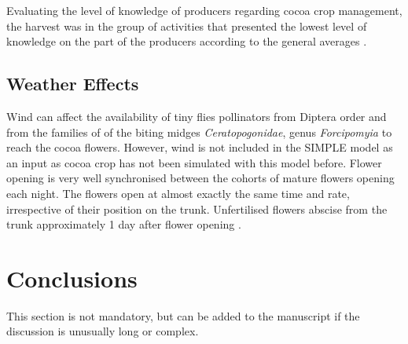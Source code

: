 \documentclass[gene,journal,article,submit,moreauthors,pdftex]{Definitions/mdpi}
\begin{document}
Evaluating the level of knowledge of producers regarding cocoa crop management, the harvest was in the group of activities that presented the lowest level of knowledge on the part of the producers according to the general averages \citep{Gutierrez2020}. 

\subsection{Weather Effects}
Wind can affect the availability of tiny flies pollinators from Diptera order and from the families of of the biting midges \textit{Ceratopogonidae},  genus  \textit{Forcipomyia} \citep{Saunders1959, kaufmann1975, sotomayor2020} to reach the cocoa flowers. However, wind is not included in the SIMPLE model as an input as cocoa crop has not been simulated with this model before. Flower opening is very well synchronised between the cohorts of mature flowers opening each night. The flowers open at almost exactly the same time and rate, irrespective of their position on the trunk. Unfertilised flowers abscise from the trunk approximately 1 day after flower opening  \citep{Niemenak2010}. 
\section{Conclusions}

This section is not mandatory, but can be added to the manuscript if the discussion is unusually long or complex.





\end{document}
